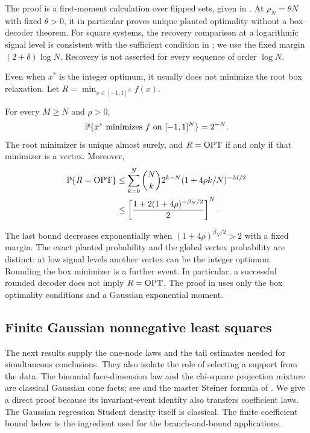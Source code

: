 The proof is a first-moment calculation over flipped sets, given in
.  At $\rho_N=\theta N$ with fixed $\theta>0$,
it in particular proves unique planted optimality without a box-decoder
theorem.  For square systems, the recovery comparison at a logarithmic
signal level is consistent with the sufficient condition in
\citet{hassibiHansenDimakisAlshamaryXu2014OptimizedMCMC}; we use the fixed
margin $(2+\delta)\log N$.  Recovery is not asserted for every sequence
of order $\log N$.

Even when $x^*$ is the integer optimum, it usually does not minimize the
root box relaxation.  Let $R=\min_{x\in[-1,1]^N}f(x)$.

\begin{proposition}
\label{bls:root-exactness}
For every $M\ge N$ and $\rho>0$,
\begin{equation}
 \mathbb{P}\{x^*\text{ minimizes }f\text{ on }[-1,1]^N\}=2^{-N}.
 \label{bls:planted-root-probability}
\end{equation}
The root minimizer is unique almost surely, and $R=\operatorname{OPT}$ if and only if
that minimizer is a vertex.  Moreover,
\begin{align}
 \mathbb{P}\{R=\operatorname{OPT}\}
 &\le\sum_{k=0}^N\binom Nk2^{k-N}
             (1+4\rho k/N)^{-M/2}\notag\\
 &\le\left[\frac{1+2(1+4\rho)^{-\beta_N/2}}2\right]^N.
 \label{bls:global-root-probability}
\end{align}
\end{proposition}

The last bound decreases exponentially when
$(1+4\rho)^{\beta_N/2}>2$ with a fixed margin.  The exact planted
probability and the global vertex probability are distinct: at low signal
levels another vertex can be the integer optimum.  Rounding the box
minimizer is a further event.  In particular, a successful rounded decoder
does not imply $R=\operatorname{OPT}$.  The proof in
 uses only the box optimality conditions
and a Gaussian exponential moment.

\subsection{Finite Gaussian nonnegative least squares}
\label{bls:nnls}

The next results supply the one-node laws and the tail estimates needed
for simultaneous conclusions.  They also isolate the role of selecting a
support from the data.  The binomial face-dimension law and the chi-square
projection mixture are classical Gaussian cone facts; see
\citet{hugSchneider2016RandomConicalTessellations} and the master Steiner
formula of \citet{mccoyTropp2014SteinerFormulas}.  We give a direct proof
because its invariant-event identity also transfers coefficient laws.
The Gaussian regression Student density itself is classical.  The finite
coefficient bound below is the ingredient used for the branch-and-bound
applications.

